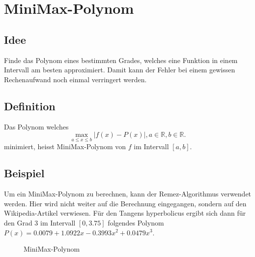 %
%
%
\section{MiniMax-Polynom 
\label{transfer:section:teil3}}



\subsection{Idee
\label{transfer:subsection:idee}}
Finde das Polynom eines bestimmten Grades, welches eine Funktion in einem Intervall am besten approximiert. Damit kann der Fehler bei einem gewissen Rechenaufwand noch einmal verringert werden.


\subsection{Definition
	\label{transfer:subsection:definition}}
Das Polynom welches 
	    $$ \max _{a \leq x \leq b}|f(x)-P(x)| , a \in \mathbb{R}, b \in \mathbb{R}.$$
minimiert, heisst MiniMax-Polynom von $f$ im Intervall $[a,b]$.
\subsection{Beispiel
	\label{transfer:subsection:beispiel}}
Um ein MiniMax-Polynom zu berechnen, kann der Remez-Algorithmus verwendet werden. Hier wird nicht weiter auf die Berechnung eingegangen, sondern auf den Wikipedia-Artikel \cite{transfer:remez} verwiesen. Für den Tangens hyperbolicus ergibt sich dann für den Grad 3 im Intervall $[0,3.75]$ folgendes Polynom $P(x)=0.0079+1.0922 x-0.3993 x^{2}+0.0479 x^{3}$.


\begin{figure}
	\centering
	\caption{MiniMax-Polynom
		\label{motivation:figure:Minimax3}}
\end{figure}



